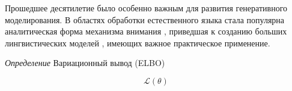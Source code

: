 Прошедшее десятилетие было особенно важным для развития генеративного моделирования.
В областях обработки естественного языка стала популярна аналитическая форма механизма внимания \cite{vaswani2017attention},
приведшая к созданию больших лингвистических моделей \cite{radford2019language}, имеющих важное практическое применение.


\textit{Определение} Вариационный вывод (ELBO)

$$
    \mathcal{L}(\theta)
$$


